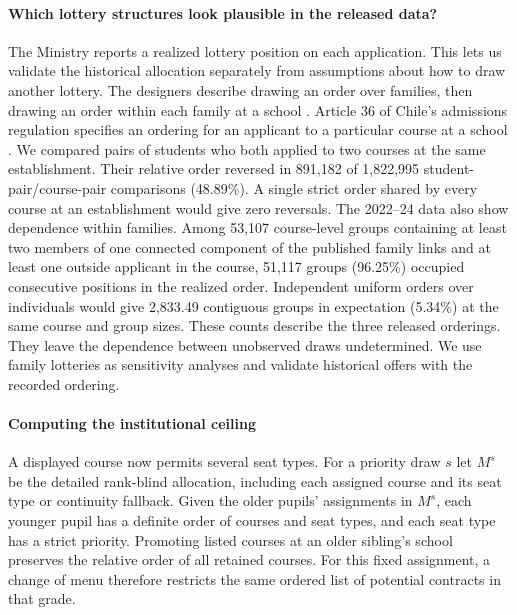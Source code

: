 \paragraph{Which lottery structures look plausible in the released data?}
The Ministry reports a realized lottery position on each application.
This lets us validate the historical allocation separately from assumptions about
how to draw another lottery.  The designers describe drawing an order over
families, then drawing an order within each family at a school
\citep[Sec.~4.1.2]{correaschool}.  Article 36 of Chile's admissions regulation
specifies an ordering for an applicant to a particular course at a school
\citep{saeDecreto}.  We compared pairs of students who both applied to two
courses at the same establishment.  Their relative order reversed in 891,182
of 1,822,995 student-pair/course-pair comparisons (48.89\%). A single strict
order shared by every course at an establishment would give zero reversals.
The 2022--24 data also show dependence within families. Among 53,107
course-level groups containing at least two members of one connected component
of the published family links and at least one outside applicant in the course,
51,117 groups (96.25\%) occupied consecutive positions in the realized order.
Independent uniform orders over individuals would give 2,833.49 contiguous groups in expectation (5.34\%) at the same course and group sizes.
These counts describe the three released orderings. They leave the dependence
between unobserved draws undetermined. We use family lotteries as sensitivity
analyses and validate historical offers with the recorded ordering.
\paragraph{Computing the institutional ceiling}
A displayed course now permits several seat types. For a priority draw $s$ let $M^s$ be the detailed rank-blind allocation, including each assigned course and its seat type or continuity fallback. Given the older pupils' assignments in $M^s$, each younger pupil has a definite order of courses and seat types, and each seat type has a strict priority. Promoting listed courses at an older sibling's school preserves the relative order of all retained courses. For this fixed assignment, a change of menu therefore restricts the same ordered list of potential contracts in that grade.

